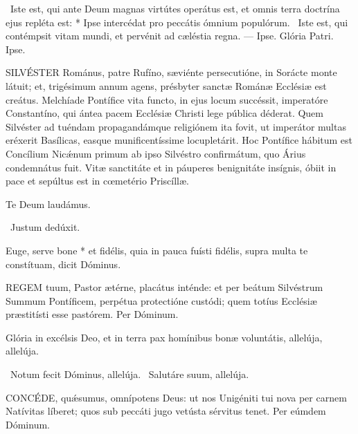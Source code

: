 \R\ Iste est, qui ante Deum magnas virtútes operátus est, et omnis terra doctrína ejus repléta est: * Ipse intercédat pro peccátis ómnium populórum. \V\ Iste est, qui contémpsit vitam mundi, et pervénit ad cæléstia regna. --- Ipse. Glória Patri. Ipse.



\lettrine[lines=2]{S}{ILVÉSTER} Románus, patre Rufíno, sæviénte persecutióne, in Sorácte monte látuit; et, trigésimum annum agens, présbyter sanctæ Románæ Ecclésiæ est creátus. Melchíade Pontífice vita functo, in ejus locum succéssit, imperatóre Constantíno, qui ántea pacem Ecclésiæ Christi lege pública déderat. Quem Silvéster ad tuéndam propagandámque religiónem ita fovit, ut imperátor multas eréxerit Basílicas, easque munificentíssime locupletárit. Hoc Pontífice hábitum est Concílium Nicǽnum primum ab ipso Silvéstro confirmátum, quo Árius condemnátus fuit. Vitæ sanctitáte et in páuperes benignitáte insígnis, óbiit in pace et sepúltus est in cœmetério Priscíllæ.

 Te Deum laudámus.



\V\ Justum dedúxit.

 Euge, serve bone * et fidélis, quia in pauca fuísti fidélis, supra multa te constítuam, dicit Dóminus.


\lettrine[lines=2]{R}{EGEM} tuum, Pastor ætérne, placátus inténde: et per beátum Silvéstrum Summum Pontíficem, perpétua protectióne custódi; quem totíus Ecclésiæ præstitísti esse pastórem. Per Dóminum.


 Glória in excélsis Deo, et in terra pax homínibus bonæ voluntátis, allelúja, allelúja.

\V\ Notum fecit Dóminus, allelúja. \R\ Salutáre suum, allelúja.


\lettrine[lines=2]{C}{ONCÉDE}, quǽsumus, omnípotens Deus: ut nos Unigéniti tui nova per carnem Natívitas líberet; quos sub peccáti jugo vetústa sérvitus tenet. Per eúmdem Dóminum.


